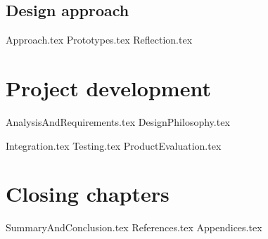 \documentclass{article} %
\begin{document}
\subsection{Design approach}
{Approach.tex}
{Prototypes.tex}
{Reflection.tex}

\newpage
\section{Project development}
{AnalysisAndRequirements.tex}
{DesignPhilosophy.tex}

{Integration.tex}
{Testing.tex}
{ProductEvaluation.tex}

\newpage
\section{Closing chapters} %
{SummaryAndConclusion.tex}
{References.tex}
{Appendices.tex}
\end{document}
